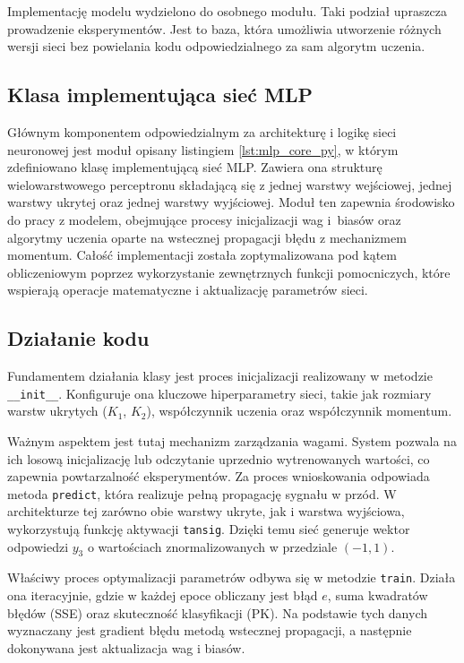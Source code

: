 \documentclass[12pt,twoside]{article}
\begin{document}
Implementację modelu wydzielono do osobnego modułu. Taki podział upraszcza prowadzenie eksperymentów. Jest to baza, która umożliwia utworzenie różnych wersji sieci bez powielania kodu odpowiedzialnego za sam algorytm uczenia.

\subsection{Klasa implementująca sieć MLP}
Głównym komponentem odpowiedzialnym za architekturę i logikę sieci neuronowej jest moduł opisany listingiem \ref{lst:mlp_core_py}, w którym zdefiniowano klasę implementującą sieć MLP. Zawiera ona strukturę wielowarstwowego perceptronu składającą się z jednej warstwy wejściowej, jednej warstwy ukrytej oraz jednej warstwy wyjściowej. Moduł ten zapewnia środowisko do pracy z modelem, obejmujące procesy inicjalizacji wag i~biasów oraz algorytmy uczenia oparte na wstecznej propagacji błędu z mechanizmem momentum. Całość implementacji została zoptymalizowana pod kątem obliczeniowym poprzez wykorzystanie zewnętrznych funkcji pomocniczych, które wspierają operacje matematyczne i aktualizację parametrów sieci.



\subsection{Działanie kodu}
Fundamentem działania klasy jest proces inicjalizacji realizowany w metodzie \texttt{\_\_init\_\_}. Konfiguruje ona kluczowe hiperparametry sieci, takie jak rozmiary warstw ukrytych ($K_1$, $K_2$), współczynnik uczenia oraz współczynnik momentum. 

Ważnym aspektem jest tutaj mechanizm zarządzania wagami. System pozwala na ich losową inicjalizację lub odczytanie uprzednio wytrenowanych wartości, co zapewnia powtarzalność eksperymentów. Za proces wnioskowania odpowiada metoda \texttt{predict}, która realizuje pełną propagację sygnału w przód. W architekturze tej zarówno obie warstwy ukryte, jak i warstwa wyjściowa, wykorzystują funkcję aktywacji \texttt{tansig}. Dzięki temu sieć generuje wektor odpowiedzi $y_3$ o wartościach znormalizowanych w przedziale $(-1, 1)$. 

Właściwy proces optymalizacji parametrów odbywa się w metodzie \texttt{train}. Działa ona iteracyjnie, gdzie w każdej epoce obliczany jest błąd $e$, suma kwadratów błędów (SSE) oraz skuteczność klasyfikacji (PK). Na podstawie tych danych wyznaczany jest gradient błędu metodą wstecznej propagacji, a następnie dokonywana jest aktualizacja wag i biasów. 
\end{document}
